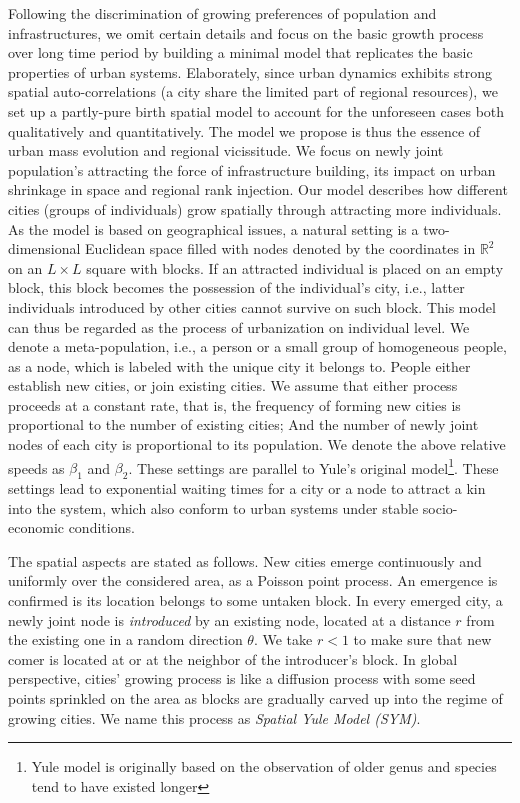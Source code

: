 \documentclass[reprint,unsortedaddress,amsmath,amssymb,aps,prl,showkeys]{revtex4-2}
\begin{document}
Following the discrimination of growing preferences of population and infrastructures, we omit certain details and focus on the basic growth process over long time period by building a minimal model that replicates the basic properties of urban systems. Elaborately, since urban dynamics exhibits strong spatial auto-correlations (a city share the limited part of regional resources), we set up a partly-pure birth spatial model to account for the unforeseen cases both qualitatively and quantitatively. The model we propose is thus the essence of urban mass evolution and regional vicissitude. We focus on newly joint population's attracting the force of infrastructure building, its impact on urban shrinkage in space and regional rank injection. 
Our model describes how different cities (groups of individuals) grow spatially through attracting more individuals. As the model is based on geographical issues, a natural setting is a two-dimensional Euclidean space filled with nodes denoted by the coordinates in $\mathbb{R}^2$ on an $L\times L$ square with blocks. If an attracted individual is placed on an empty block, this block becomes the possession of the individual's city, i.e., latter individuals introduced by other cities cannot survive on such block. This model can thus be regarded as the process of urbanization on individual level. We denote a meta-population, i.e., a person or a small group of homogeneous people, as a node, which is labeled with the unique city it belongs to. People either establish new cities, or join existing cities. We assume that either process proceeds at a constant rate, that is, the frequency of forming new cities is proportional to the number of existing cities; And the number of newly joint nodes of each city is proportional to its population. We denote the above relative speeds as $\beta_1$ and $\beta_2$. These settings are parallel to Yule's original model\cite{yule1925ii}\footnote{Yule model is originally based on the observation of older genus and species tend to have existed longer}. These settings lead to exponential waiting times for a city or a node to attract a kin into the system, which also conform to urban systems under stable socio-economic conditions. 


The spatial aspects are stated as follows. New cities emerge continuously and uniformly over the considered area, as a Poisson point process\cite{miles1970homogeneous}. An emergence is confirmed is its location belongs to some untaken block. In every emerged city, a newly joint node is \emph{introduced} by an existing node, located at a distance $r$ from the existing one in a random direction $\theta$. We take $r < 1$ to make sure that new comer is located at or at the neighbor of the introducer's block. In global perspective, cities' growing process is like a diffusion process\cite{RevModPhys.87.925} with some seed points sprinkled on the area as blocks are gradually carved up into the regime of growing cities. We name this process as \emph{Spatial Yule Model (SYM)}.
\end{document}

